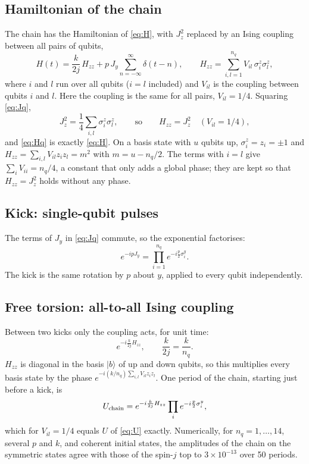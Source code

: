 \documentclass[11pt,a4paper]{article}
\begin{document}
\subsection{Hamiltonian of the chain}

The chain has the Hamiltonian of \cref{eq:H}, with $J_z^2$ replaced by an Ising coupling between all pairs of qubits,
\begin{equation}\label{eq:Hq}
  H(t) = \frac{k}{2j}\,H_{zz} + p\,J_y\sum_{n=-\infty}^{\infty}\delta(t-n),\qquad
  H_{zz} = \sum_{i,l=1}^{n_q} V_{il}\,\sigma^z_i\sigma^z_l ,
\end{equation}
where $i$ and $l$ run over all qubits ($i=l$ included) and $V_{il}$ is the coupling between qubits $i$ and $l$. Here
the coupling is the same for all pairs, $V_{il}=1/4$. Squaring \cref{eq:Jq},
\begin{equation}\label{eq:Hzz}
  J_z^2 = \frac14\sum_{i,l}\sigma^z_i\sigma^z_l ,\qquad\text{so}\qquad H_{zz} = J_z^2 \quad (V_{il}=1/4),
\end{equation}
and \cref{eq:Hq} is exactly \cref{eq:H}. On a basis state with $u$ qubits up, $\sigma^z_i=z_i=\pm1$ and
$H_{zz}=\sum_{i,l}V_{il}z_iz_l = m^2$ with $m=u-n_q/2$. The terms with $i=l$ give $\sum_iV_{ii}=n_q/4$, a constant
that only adds a global phase; they are kept so that $H_{zz}=J_z^2$ holds without any phase.

\subsection{Kick: single-qubit pulses}

The terms of $J_y$ in \cref{eq:Jq} commute, so the exponential factorises:
\begin{equation}
  e^{-ipJ_y} = \prod_{i=1}^{n_q} e^{-i\frac p2\sigma^y_i}.
\end{equation}
The kick is the same rotation by $p$ about $y$, applied to every qubit independently.

\subsection{Free torsion: all-to-all Ising coupling}

Between two kicks only the coupling acts, for unit time:
\begin{equation}\label{eq:torq}
  e^{-i\frac{k}{2j}H_{zz}} ,\qquad \frac{k}{2j} = \frac{k}{n_q}.
\end{equation}
$H_{zz}$ is diagonal in the basis $|b\rangle$ of up and down qubits, so this multiplies every basis state by the phase
$e^{-i(k/n_q)\sum_{i,l}V_{il}z_iz_l}$. One period of the chain, starting just before a kick, is
\begin{equation}\label{eq:Uq}
  U_{\rm chain} = e^{-i\frac{k}{2j}H_{zz}}\prod_{i}e^{-i\frac p2\sigma^y_i} ,
\end{equation}
which for $V_{il}=1/4$ equals $U$ of \cref{eq:U} exactly. Numerically, for $n_q=1,\dots,14$, several $p$ and $k$, and
coherent initial states, the amplitudes of the chain on the symmetric states agree with those of the spin-$j$ top to
$3\times10^{-13}$ over 50 periods.
\end{document}
